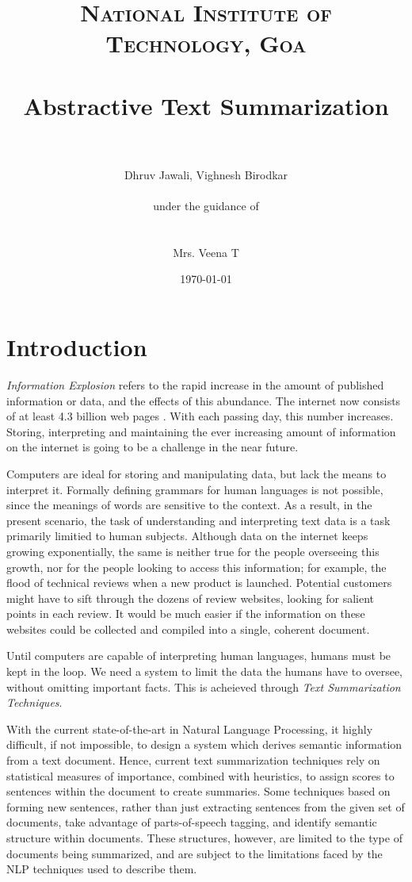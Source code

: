 \documentclass[paper=a4, fontsize=11pt]{scrartcl} %
\title{	
\normalfont \normalsize 
\textsc{National Institute of Technology, Goa} \\ [25pt] %
\horrule{0.5pt} \\[0.4cm] %
\huge Abstractive Text Summarization \\ %
\horrule{2pt} \\[0.5cm] %
}
\author{Dhruv Jawali, Vighnesh Birodkar \\
\\
\small{under the guidance of} \\
\\
\\
Mrs. Veena T
} %
\date{\normalsize\today} %
\numberwithin{equation}{section} %
\numberwithin{figure}{section} %
\numberwithin{table}{section} %
\begin{document}
\maketitle %
\pagebreak
\tableofcontents
\pagebreak




\section{Introduction}
\emph{Information Explosion} \cite{fshock} refers to the rapid increase in the amount of published information or data, and the effects of this abundance. The internet now consists of at least 4.3 billion web pages \cite{websize}. With each passing day, this number increases. Storing, interpreting and maintaining the ever increasing amount of information on the internet is going to be a challenge in the near future.\\
\par
Computers are ideal for storing and manipulating data, but lack the means to interpret it. Formally defining grammars for human languages is not possible, since the meanings of words are sensitive to the context. As a result, in the present scenario, the task of understanding and interpreting text data is a task primarily limitied to human subjects. Although data on the internet keeps growing exponentially, the same is neither true for the people overseeing this growth, nor for the people looking to access this information; for example, the flood of technical reviews when a new product is launched. Potential customers might have to sift through the dozens of review websites, looking for salient points in each review. It would be much easier if the information on these websites could be collected and compiled into a single, coherent document.\\
\par
Until computers are capable of interpreting human languages, humans must be kept in the loop. We need a system to limit the data the humans have to oversee, without omitting important facts. This is acheieved through \emph{Text Summarization Techniques}.\\
\par

With the current state-of-the-art in Natural Language Processing, it highly difficult, if not impossible, to design a system which derives semantic information from a text document. Hence, current text summarization techniques rely on statistical measures of importance, combined with heuristics, to assign scores to sentences within the document to create summaries. Some techniques based on forming new sentences, rather than just extracting sentences from the given set of documents, take advantage of parts-of-speech tagging, and identify semantic structure within documents. These structures, however, are limited to the type of documents being summarized, and are subject to the limitations faced by the NLP techniques used to describe them.\\
\par
\end{document}
